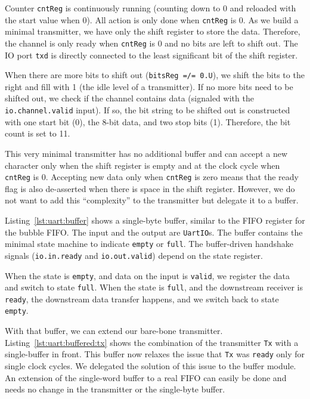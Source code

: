 \documentclass[%
    10pt,
    headinclude, footinclude=false,
    openright, %
    notitlepage,
    cleardoublepage=empty,
    headsepline,
    numbers=noenddot,
    bibliography=totoc, index=totoc,
    ]{scrbook}
\newcommand{\code}[1]{{\lstinline[basicstyle=\small\ttfamily]{#1}}}
\begin{document}
Counter \code{cntReg} is continuously running (counting down to 0
and reloaded with the start value when 0). All action is only done when
\code{cntReg} is 0. As we build a minimal transmitter, we have only
the shift register to store the data. Therefore, the channel is only ready
when \code{cntReg} is 0 and no bits are left to shift out.
The IO port \code{txd} is directly connected to the least significant bit
of the shift register.

When there are more bits to shift out (\code{bitsReg =/= 0.U}),
we shift the bits to the right and fill with 1 (the idle level
of a transmitter).
If no more bits need to be shifted out, we check if the channel contains
data (signaled with the \code{io.channel.valid} input). If so, the bit string to
be shifted out is constructed with one start bit (0), the 8-bit data, and
two stop bits (1). Therefore, the bit count is set to 11.

This very minimal transmitter has no additional buffer and can
accept a new character only when the shift register is empty
and at the clock cycle when \code{cntReg} is 0.
Accepting new data only when \code{cntReg} is zero means
that the ready flag is also de-asserted when there is
space in the shift register. However, we do not want to add this
``complexity'' to the transmitter but delegate it to a buffer.


Listing~\ref{lst:uart:buffer} shows a single-byte buffer, similar to
the FIFO register for the bubble FIFO. The input and the output
are \code{UartIO}s.
The buffer contains the minimal state machine
to indicate \code{empty} or \code{full}. The buffer-driven handshake
signals (\code{io.in.ready} and \code{io.out.valid}) depend on the state
register.

When the state is \code{empty}, and data on the input is \code{valid},
we register the data and switch to state \code{full}.
When the state is \code{full}, and the downstream receiver is
\code{ready}, the downstream data transfer happens, and we switch
back to state \code{empty}.


With that buffer, we can extend our bare-bone transmitter.
Listing~\ref{lst:uart:buffered:tx} shows the combination of the transmitter \code{Tx}
with a single-buffer in front. This buffer now relaxes the issue that \code{Tx}
was \code{ready} only for single clock cycles. We delegated the solution of
this issue to the buffer module.
An extension of the single-word buffer to a real FIFO can easily be done
and needs no change in the transmitter or the single-byte buffer.
\end{document}
